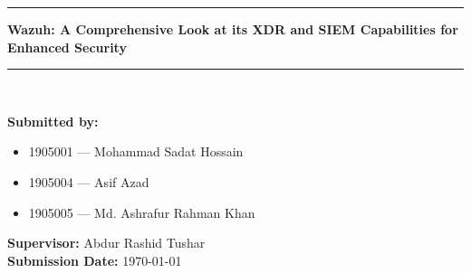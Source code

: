 \begin{titlepage}
\begin{centering}
       \noindent\rule[0.5ex]{\linewidth}{1pt} 
        \Large
        \textbf{Wazuh: A Comprehensive Look at its XDR and SIEM Capabilities for Enhanced Security}\\
        \noindent\rule[0.5ex]{\linewidth}{1pt}\\[1.5em]
    \end{centering}
    \noindent
\large
\textbf{Submitted by: }
         \begin{itemize}[leftmargin= 16pt, label={}, after=\vspace{1cm}]
             \item 1905001 --- Mohammad Sadat Hossain
             \item 1905004 --- Asif Azad
             \item 1905005 --- Md. Ashrafur Rahman Khan
        \end{itemize}
\vspace{-.5cm}
\textbf{Supervisor: } Abdur Rashid Tushar \\[0.4em]
\textbf{Submission Date: } \today

\end{titlepage}
\restoregeometry%
